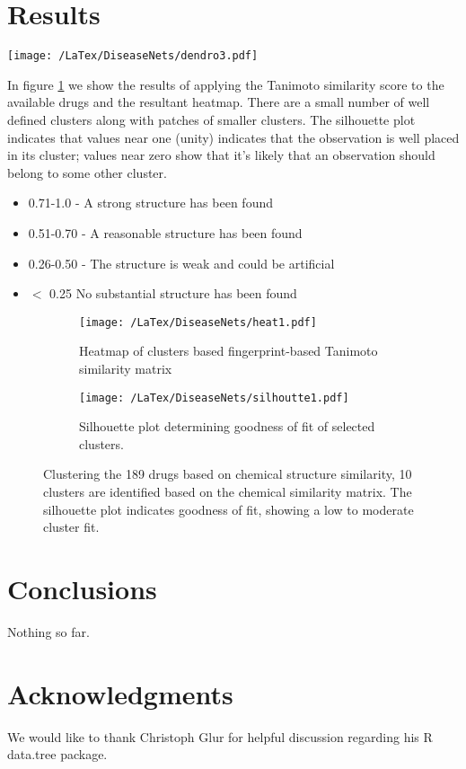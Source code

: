 \documentclass[authoryear,10pt,preprint]{elsarticle}
\begin{document}
\section{Results}


\begin{figure*}[ht]
  \begin{center}              %
    \texttt{[image: /LaTex/DiseaseNets/dendro3.pdf]} %
  \end{center}
 \caption{Dendrogram of clusters, based on chemical fingerprint properties of 189 drugs}
\label{dendro2}
\end{figure*}

In figure \ref{fig:heat} we show the results of applying the Tanimoto similarity score to the available drugs and the resultant heatmap. There are  a small number of well defined clusters along with patches of smaller clusters. The silhouette plot indicates that  values near one (unity) indicates  that the observation is well placed in its cluster; values near zero show that it's likely that an observation should belong to some other cluster. 

\begin{itemize}
\item 0.71-1.0  - A strong structure has been found
\item 0.51-0.70 - A reasonable structure has been found
\item 0.26-0.50 - The structure is weak and could be artificial
\item $<$ 0.25 No substantial structure has been found
\end{itemize}


\begin{figure}[h]
  \begin{subfigure}[b]{0.3\textwidth}
    \texttt{[image: /LaTex/DiseaseNets/heat1.pdf]} %
    \caption{Heatmap of clusters based fingerprint-based Tanimoto similarity matrix}
    \label{fig:heat}
  \end{subfigure}
  \hfill
  \begin{subfigure}[b]{0.5\textwidth}
    \texttt{[image: /LaTex/DiseaseNets/silhoutte1.pdf]} %
    \caption{Silhouette plot determining goodness of fit of selected clusters.}
    \label{fig:sillo}
  \end{subfigure}
  \caption{Clustering the 189 drugs based on chemical structure similarity, 10 clusters are identified based on the chemical similarity matrix. The silhouette plot indicates goodness of fit, showing a low to moderate cluster fit. }
\end{figure}

\section{Conclusions}
Nothing so far.

\section{Acknowledgments}
We would like to thank Christoph Glur for helpful discussion regarding his R data.tree package.





\end{document}
